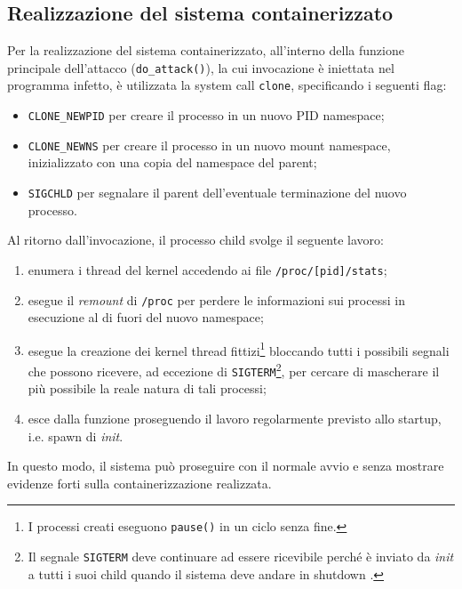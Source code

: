 \documentclass{article}
\begin{document}
\subsection{Realizzazione del sistema containerizzato}
Per la realizzazione del sistema containerizzato, all'interno della funzione principale dell'attacco (\texttt{do\_attack()}), la cui invocazione è iniettata nel programma infetto, è utilizzata la system call \texttt{clone}, specificando i seguenti flag:
\begin{itemize}
	\item \texttt{CLONE\_NEWPID} per creare il processo in un nuovo PID namespace;
	\item \texttt{CLONE\_NEWNS} per creare il processo in un nuovo mount namespace, inizializzato con una copia del namespace del parent;
	\item \texttt{SIGCHLD} per segnalare il parent dell'eventuale terminazione del nuovo processo.
\end{itemize}
Al ritorno dall'invocazione, il processo child svolge il seguente lavoro:
\begin{enumerate}
	\item enumera i thread del kernel accedendo ai file \texttt{/proc/[pid]/stats};
	\item esegue il \textsl{remount} di \texttt{/proc} per perdere le informazioni sui processi in esecuzione al di fuori del nuovo namespace;
	\item esegue la creazione dei kernel thread fittizi\footnote{I processi creati eseguono \texttt{pause()} in un ciclo senza fine.} bloccando tutti i possibili segnali che possono ricevere, ad eccezione di \texttt{SIGTERM}\footnote{Il segnale \texttt{SIGTERM} deve continuare ad essere ricevibile perché è inviato da \textsl{init} a tutti i suoi child quando il sistema deve andare in shutdown \cite{deamons-shutdown}.}, per cercare di mascherare il più possibile la reale natura di tali processi;
	\item esce dalla funzione proseguendo il lavoro regolarmente previsto allo startup, i.e. spawn di \textsl{init}.
\end{enumerate}
In questo modo, il sistema può proseguire con il normale avvio e senza mostrare evidenze forti sulla containerizzazione realizzata.
\end{document}
